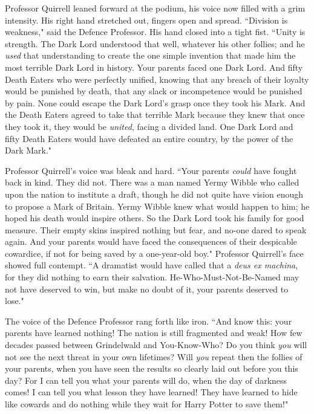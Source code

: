 Professor Quirrell leaned forward at the podium, his voice now filled with a grim intensity. His right hand stretched out, fingers open and spread. ``Division is weakness," said the Defence Professor. His hand closed into a tight fist. ``Unity is strength. The Dark Lord understood that well, whatever his other follies; and he \emph{used} that understanding to create the one simple invention that made him the most terrible Dark Lord in history. Your parents faced one Dark Lord. And fifty Death Eaters who were perfectly unified, knowing that any breach of their loyalty would be punished by death, that any slack or incompetence would be punished by pain. None could escape the Dark Lord's grasp once they took his Mark. And the Death Eaters agreed to take that terrible Mark because they knew that once they took it, they would be \emph{united}, facing a divided land. One Dark Lord and fifty Death Eaters would have defeated an entire country, by the power of the Dark Mark."

Professor Quirrell's voice was bleak and hard. ``Your parents \emph{could} have fought back in kind. They did not. There was a man named Yermy Wibble who called upon the nation to institute a draft, though he did not quite have vision enough to propose a Mark of Britain. Yermy Wibble knew what would happen to him; he hoped his death would inspire others. So the Dark Lord took his family for good measure. Their empty skins inspired nothing but fear, and no-one dared to speak again. And your parents would have faced the consequences of their despicable cowardice, if not for being saved by a one-year-old boy." Professor Quirrell's face showed full contempt. ``A dramatist would have called that a \emph{deus ex machina}, for they did nothing to earn their salvation. He-Who-Must-Not-Be-Named may not have deserved to win, but make no doubt of it, your parents deserved to lose."

The voice of the Defence Professor rang forth like iron. ``And know this: your parents have learned nothing! The nation is still fragmented and weak! How few decades passed between Grindelwald and You-Know-Who? Do you think \emph{you} will not see the next threat in your own lifetimes? Will \emph{you} repeat then the follies of your parents, when you have seen the results so clearly laid out before you this day? For I can tell you what your parents will do, when the day of darkness comes! I can tell you what lesson they have learned! They have learned to hide like cowards and do nothing while they wait for Harry Potter to save them!"

